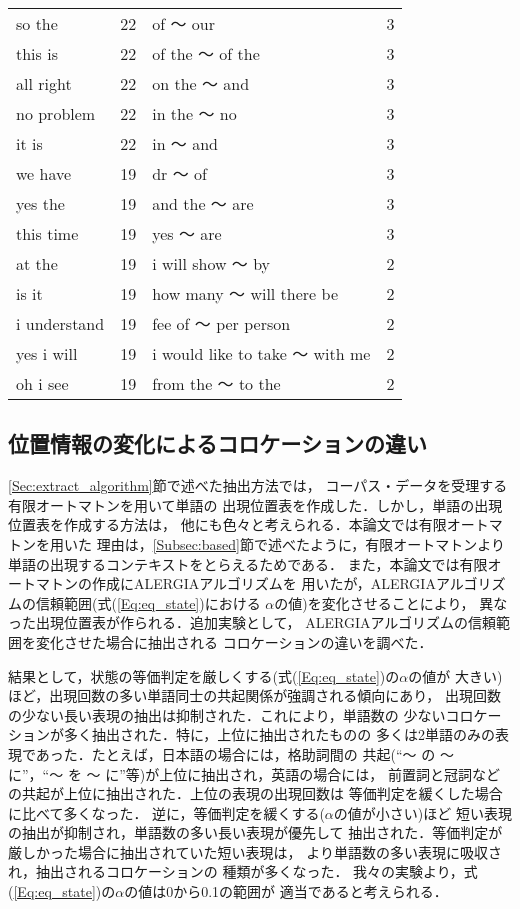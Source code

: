 \begin{table}[hbt]
\begin{center}
\begin{footnotesize}
\begin{tabular}{|lr||lr|}
so the & 22 & of 〜 our & 3\\
this is & 22 & of the 〜 of the & 3\\
all right & 22 & on the 〜 and & 3\\
no problem & 22 & in the 〜 no & 3\\
it is & 22 & in 〜 and & 3\\
we have & 19 & dr 〜 of & 3\\
yes the & 19 & and the 〜 are & 3\\
this time & 19 & yes 〜 are & 3\\
at the & 19 & i will show 〜 by & 2\\
is it & 19 & how many 〜 will there be & 2\\
i understand & 19 & fee of 〜 per person & 2\\
yes i will & 19 & i would like to take 〜 with me & 2\\
oh i see & 19 & from the 〜 to the & 2\\
\hline
\end{tabular}
\end{footnotesize}
\end{center}
\end{table}

\subsection{位置情報の変化によるコロケーションの違い}

\ref{Sec:extract_algorithm}節で述べた抽出方法では，
コーパス・データを受理する有限オートマトンを用いて単語の
出現位置表を作成した．しかし，単語の出現位置表を作成する方法は，
他にも色々と考えられる．本論文では有限オートマトンを用いた
理由は，\ref{Subsec:based}節で述べたように，有限オートマトンより
単語の出現するコンテキストをとらえるためである．
また，本論文では有限オートマトンの作成にALERGIAアルゴリズムを
用いたが，ALERGIAアルゴリズムの信頼範囲(式(\ref{Eq:eq_state})における
$\alpha$の値)を変化させることにより，
異なった出現位置表が作られる．追加実験として，
ALERGIAアルゴリズムの信頼範囲を変化させた場合に抽出される
コロケーションの違いを調べた．

結果として，状態の等価判定を厳しくする(式(\ref{Eq:eq_state})の\hspace{-0.2mm}$\alpha$の\hspace{-0.2mm}値が
大きい)ほど，出現回数の多い単語同士の共起関係が強調される傾向にあり，
出現回数の少ない長い表現の抽出は抑制された．これにより，単語数の
少ないコロケーションが多く抽出された．特に，上位に抽出されたものの
多くは2単語のみの表現であった．たとえば，日本語の場合には，格助詞間の
共起(``〜 の 〜 に''，``〜 を 〜 に''等)が上位に抽出され，英語の場合には，
前置詞と冠詞などの共起が上位に抽出された．上位の表現の出現回数は
等価判定を緩くした場合に比べて多くなった．
逆に，等価判定を緩くする($\alpha$の値が小さい)ほど
短い表現の抽出が抑制され，単語数の多い長い表現が優先して
抽出された．等価判定が厳しかった場合に抽出されていた短い表現は，
より単語数の多い表現に吸収され，抽出されるコロケーションの
種類が多くなった．
我々の実験より，式(\ref{Eq:eq_state})の$\alpha$の値は0から0.1の範囲が
適当であると考えられる．

